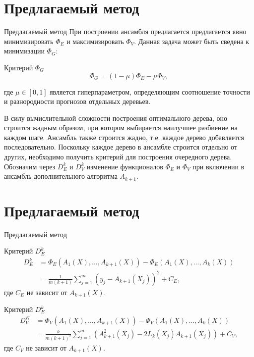\documentclass[10pt,pdf,hyperref={unicode}]{beamer}
\begin{document}
\section{Предлагаемый метод}
\begin{frame}{Предлагаемый метод}
    При построении ансамбля предлагается предлагается явно минимизировать $\Phi_E$ и максимизировать $\Phi_V$. Данная задача может быть сведена к минимизации $\Phi_G$:
\begin{block}{Критерий $\Phi_G$}
    \begin{equation*}
    \Phi_G = (1 - \mu) \Phi_E - \mu \Phi_V,
\end{equation*}
\end{block}
    где $\mu \in [0, 1]$ является гиперпараметром, определяющим соотношение точности и разнородности прогнозов отдельных деревьев. 

    В силу вычислительной сложности построения оптимального дерева, оно строится жадным образом, при котором выбирается наилучшее разбиение на каждом шаге. Ансамбль также строится жадно, т.е. каждое дерево добавляется последовательно. Поскольку каждое дерево в ансамбле строится отдельно от других, необходимо получить критерий для построения очередного дерева. Обозначим через $D_E^k$ и $D_V^k$ изменение функционалов $\Phi_E$ и $\Phi_V$ при включении в ансамбль дополнительного алгоритма $A_{k+1}$. 
\end{frame}

\section{Предлагаемый метод}
\begin{frame}{Предлагаемый метод}
\begin{block}{Критерий $D_E^k$}
    \begin{align*}
    D_E^k &= \Phi_E(A_1(X), ..., A_{k+1}(X)) - \Phi_E(A_1(X), \dots, A_k(X)) \\
    &= \frac{1}{m(k+1)}\sum_{j=1}^{m}(y_j - A_{k+1}(X_j))^2 + C_E,
    \end{align*}
    где $C_E$ не зависит от $A_{k+1}(X)$.
\end{block}
\begin{block}{Критерий $D_E^k$}
    \begin{align*}
    D_V^K &= \Phi_V(A_1(X), \dots, A_{k+1}(X))-\Phi_V(A_1(X), \dots, A_k(X)) \\
    &= \frac{k}{m(k+1)^2} \sum_{j=1}^{m} (A_{k+1}^2(X_j) - 2L_k(X_j)A_{k+1}(X_j)) + C_V,
    \end{align*}
    где $C_V$ не зависит от $A_{k+1}(X)$.
\end{block}
\end{frame}
\end{document}

